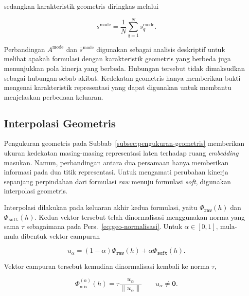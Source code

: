 sedangkan karakteristik geometris diringkas melalui

\begin{equation}
    \overline{s}^{\mathrm{mode}}
    =
    \frac{1}{N}
    \sum_{q=1}^{N}
    \bar{s}_{q}^{\mathrm{mode}}.
    \label{eq:geo-final-summary}
\end{equation}

Perbandingan $A^{\mathrm{mode}}$ dan $\overline{s}^{\mathrm{mode}}$ digunakan
sebagai analisis deskriptif untuk melihat apakah formulasi dengan karakteristik
geometris yang berbeda juga menunjukkan pola kinerja yang berbeda. Hubungan
tersebut tidak dimaksudkan sebagai hubungan sebab-akibat. Kedekatan geometris
hanya memberikan bukti mengenai karakteristik representasi yang dapat
digunakan untuk membantu menjelaskan perbedaan keluaran.

\subsection{Interpolasi Geometris}
\label{subsec:interpolasi-geometris}

Pengukuran geometris pada Subbab~\ref{subsec:pengukuran-geometris}
memberikan ukuran kedekatan masing-masing representasi laten terhadap ruang
\textit{embedding} masukan. Namun, perbandingan antara dua persamaan hanya
memberikan informasi pada dua titik representasi. Untuk mengamati perubahan
kinerja sepanjang perpindahan dari formulasi \textit{raw} menuju formulasi
\textit{soft}, digunakan interpolasi geometris.

Interpolasi dilakukan pada keluaran akhir kedua formulasi, yaitu
$\Phi_{\texttt{raw}}(h)$ dan $\Phi_{\texttt{soft}}(h)$. Kedua vektor tersebut
telah dinormalisasi menggunakan norma yang sama $\tau$ sebagaimana pada
Pers.~\eqref{eq:geo-normalisasi}. Untuk $\alpha\in[0,1]$, mula-mula dibentuk
vektor campuran

\begin{equation}
u_{\alpha}
=
(1-\alpha)\Phi_{\texttt{raw}}(h)
+
\alpha\Phi_{\texttt{soft}}(h).
\label{eq:m-interp-u}
\end{equation}

Vektor campuran tersebut kemudian dinormalisasi kembali ke norma $\tau$,

\begin{equation}
\boxed{
\Phi_{\mathrm{mix}}^{(\alpha)}(h)
=
\tau
\frac{u_{\alpha}}
{\lVert u_{\alpha}\rVert}
}
\qquad
u_{\alpha}\neq\mathbf{0}.
\label{eq:m-interp}
\end{equation}

